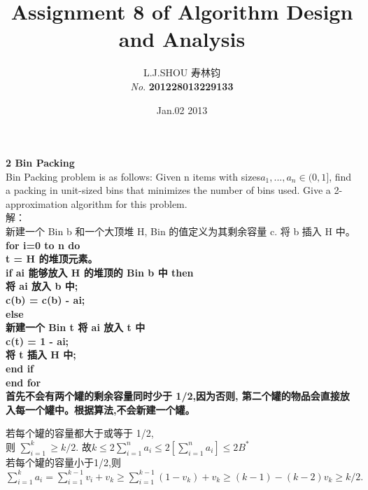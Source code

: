 \documentclass[11pt]{article}
\begin{document}
\begin{CJK}{UTF8}{gkai}
\title{ \textbf{Assignment 8 of Algorithm Design and Analysis}}
\author{L.J.SHOU  寿林钧\\{\slshape No}. \bf 201228013229133}
\date{Jan.02 2013}
\maketitle %
\noindent
{\bf \large  2 Bin Packing}\\[2mm]
Bin Packing problem is as follows: Given n items with sizes$ a_1 , ..., a_{n}\in (0, 1]$,
find a packing in unit-sized bins that minimizes the number of bins used.
Give a 2-approximation algorithm for this problem.\\
解：\\
新建一个 Bin b 和一个大顶堆 H, Bin 的值定义为其剩余容量 c. 将 b 插入 H 中。
\bf{for} i=0 to n \bf{do}\\
t = H 的堆顶元素。\\
\bf{if} ai 能够放入 H 的堆顶的 Bin b 中 \bf{then}\\
将 ai 放入 b 中;\\
c(b) = c(b) - ai;\\
\bf{else}\\
新建一个 Bin t 将 ai 放入 t 中\\
c(t) = 1 - ai;\\
将 t 插入 H 中;\\
\bf{end if}\\
\bf{end for}\\
首先不会有两个罐的剩余容量同时少于 1/2,因为否则,
第二个罐的物品会直接放入每一个罐中。根据算法,不会新建一个罐。\\
\indent

若每个罐的容量都大于或等于 1/2,\\
则 $\sum_{i=1}^k \geq k/2.$ 故$ k\leq2\sum_{i=1}^na_i\leq2[\sum_{i=1}^na_i]\leq2B^{*}$\\
\indent
若每个罐的容量小于1/2,则\\
$\sum_{i=1}^ka_i = \sum_{i=1}^{k-1}v_i+v_k \geq \sum_{i=1}^{k-1}(1-v_k)+v_k \geq(k-1)-(k-2)v_k \geq k/2.$\\



\end{CJK}
\end{document}
